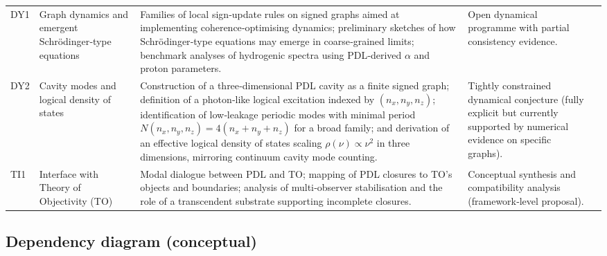 \documentclass{article}
\begin{document}
\begin{longtable}{L{0.8cm}L{2.5cm}L{5cm}L{3.2cm}L{1cm}}
DY1 &
Graph dynamics and emergent Schr\"odinger‑type equations &
Families of local sign‑update rules on signed graphs aimed at implementing coherence‑optimising dynamics; preliminary sketches of how Schr\"odinger‑type equations may emerge in coarse‑grained limits; benchmark analyses of hydrogenic spectra using PDL‑derived $\alpha$ and proton parameters. &
Open dynamical programme with partial consistency evidence. &
\citep{Effective_Fields_PDL_2026,Schrodinger_Sketch_v2_2026,Schrodinger_PDL_v2_2026,PDL_position} \\[0.4em]

DY2 &
Cavity modes and logical density of states &
Construction of a three‑dimensional PDL cavity as a finite signed graph; definition of a photon‑like logical excitation indexed by $(n_x,n_y,n_z)$; identification of low‑leakage periodic modes with minimal period $N(n_x,n_y,n_z)=4(n_x+n_y+n_z)$ for a broad family; and derivation of an effective logical density of states scaling $\rho(\nu)\propto \nu^2$ in three dimensions, mirroring continuum cavity mode counting. &
Tightly constrained dynamical conjecture (fully explicit but currently supported by numerical evidence on specific graphs). &
\citep{PDLCavityModes2026,Effective_Fields_PDL_2026} \\[0.4em]

TI1 &
Interface with Theory of Objectivity (TO) &
Modal dialogue between PDL and TO; mapping of PDL closures to TO’s objects and boundaries; analysis of multi‑observer stabilisation and the role of a transcendent substrate supporting incomplete closures. &
Conceptual synthesis and compatibility analysis (framework‑level proposal). &
\citep{PDL_TO_dialogue,PDL_position,ExistencePulsatingClosure2026} \\[0.4em]

\end{longtable}

\subsection{Dependency diagram (conceptual)}
\end{document}
